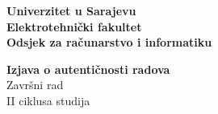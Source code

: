 \pagebreak

\thispagestyle{plain}
\begin{flushleft}
	\textbf{Univerzitet u Sarajevu}\\
	\textbf{Elektrotehnički fakultet}\\
	\textbf{Odsjek za računarstvo i informatiku}\\
\end{flushleft}

\begin{center}
	\vspace{1cm}
	{\Large \textbf{Izjava o autentičnosti radova}}\\
	\vspace{0.3cm}
	{\Large Završni rad}\\
	\vspace{0.2cm}
	{\Large II ciklusa studija}
	\vspace{0.5cm}
\end{center}

